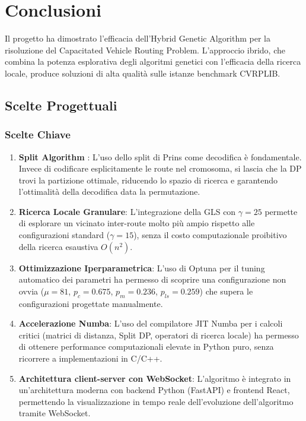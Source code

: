 \chapter{Conclusioni}

Il progetto ha dimostrato l'efficacia dell'Hybrid Genetic Algorithm per la
risoluzione del Capacitated Vehicle Routing Problem. L'approccio ibrido, che
combina la potenza esplorativa degli algoritmi genetici con l'efficacia della
ricerca locale, produce soluzioni di alta qualit\`a sulle istanze benchmark
CVRPLIB.

\section{Scelte Progettuali}

\subsection{Scelte Chiave}

\begin{enumerate}[label=\textbf{\arabic*.}]
    \item \textbf{Split Algorithm} \cite{prins2004simple}: L'uso dello split di Prins come decodifica
    \`e fondamentale. Invece di codificare esplicitamente le route nel cromosoma,
    si lascia che la DP trovi la partizione ottimale, riducendo lo spazio di
    ricerca e garantendo l'ottimalit\`a della decodifica data la permutazione.

    \item \textbf{Ricerca Locale Granulare}: L'integrazione della GLS con
    $\gamma = 25$ permette di esplorare un vicinato inter-route molto pi\`u
    ampio rispetto alle configurazioni standard ($\gamma = 15$), senza il
    costo computazionale proibitivo della ricerca esaustiva $O(n^2)$.

    \item \textbf{Ottimizzazione Iperparametrica}: L'uso di Optuna per il
    tuning automatico dei parametri ha permesso di scoprire una configurazione
    non ovvia ($\mu = 81$, $p_c = 0.675$, $p_m = 0.236$, $p_{ls} = 0.259$)
    che supera le configurazioni progettate manualmente.

    \item \textbf{Accelerazione Numba}: L'uso del compilatore JIT Numba per i
    calcoli critici (matrici di distanza, Split DP, operatori di ricerca locale)
    ha permesso di ottenere performance computazionali elevate in Python puro,
    senza ricorrere a implementazioni in C/C++.

    \item \textbf{Architettura client-server con WebSocket}: L'algoritmo \`e
    integrato in un'architettura moderna con backend Python (FastAPI) e frontend
    React, permettendo la visualizzazione in tempo reale dell'evoluzione
    dell'algoritmo tramite WebSocket.
\end{enumerate}

